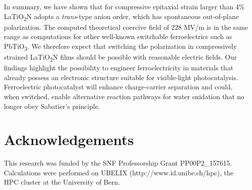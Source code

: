 \documentclass[prl,reprint,aps,twocolumn]{revtex4-1}
\begin{document}
In summary, we have shown that for compressive epitaxial strain larger than 4\% LaTiO\textsubscript{2}N adopts a \textit{trans}-type anion order, which has spontaneous out-of-plane polarization. 
The computed theoretical coercive field of 228 MV/m is in the same range as computations for other well-known switchable ferroelectrics such as PbTiO\textsubscript{3}. 
We therefore expect that switching the polarization in compressively strained LaTiO\textsubscript{2}N films should be possible with reasonable electric fields. Our findings highlight the possibility to engineer ferroelectricity in materials that already possess an electronic structure suitable for visible-light photocatalysis. Ferroelectric photocatalyst will enhance charge-carrier separation and could, when switched, enable alternative reaction pathways for water oxidation that no longer obey Sabatier's principle.

\section{Acknowledgements}

This research was funded by the SNF Professorship Grant PP00P2\_157615. Calculations were performed on UBELIX (http://www.id.unibe.ch/hpc), the HPC cluster at the University of Bern.


\end{document}
